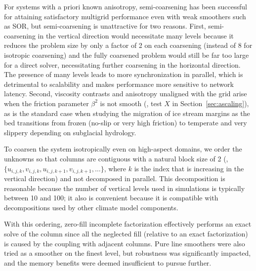 For systems with a priori known anisotropy, semi-coarsening has been successful for attaining
satisfactory multigrid performance even with weak smoothers such as SOR, but semi-coarsening is
unattractive for two reasons.  First, semi-coarsening in the vertical direction would necessitate
many levels because it reduces the problem size by only a factor of 2 on each coarsening (instead of
8 for isotropic coarsening) and the fully coarsened problem would still be far too large for a
direct solver, necessitating further coarsening in the horizontal direction.  The presence of many
levels leads to more synchronization in parallel, which is detrimental to scalability and makes
performance more sensitive to network latency.  Second, viscosity contrasts and anisotropy
unaligned with the grid arise when the friction parameter $\beta^2$ is not smooth (\eg, test $X$ in Section~\ref{sec:ascaling}), as is the standard
case when studying the migration of ice stream margins as the bed transitions from frozen (no-slip
or very high friction) to temperate and very slippery depending on subglacial hydrology.

To coarsen the system isotropically even on high-aspect domains, we order the unknowns so that columns
are contiguous with a natural block size of 2
(\ie, $\{u_{i,j,k},v_{i,j,k},u_{i,j,k+1},v_{i,j,k+1},\dotsc\}$, where $k$ is the index that is
increasing in the vertical direction) and not decomposed in parallel.  This decomposition is
reasonable because the number of vertical levels used in simulations is typically between 10 and 100;
it also is convenient because it is compatible with decompositions used by other climate model components.

With this ordering, zero-fill incomplete factorization effectively performs an exact solve of the
column since all the neglected fill (relative to an exact factorization) is caused by the coupling
with adjacent columns.  Pure line smoothers were also tried as a smoother on the finest level, but
robustness was significantly impacted, and the memory benefits were deemed insufficient to pursue
further.

